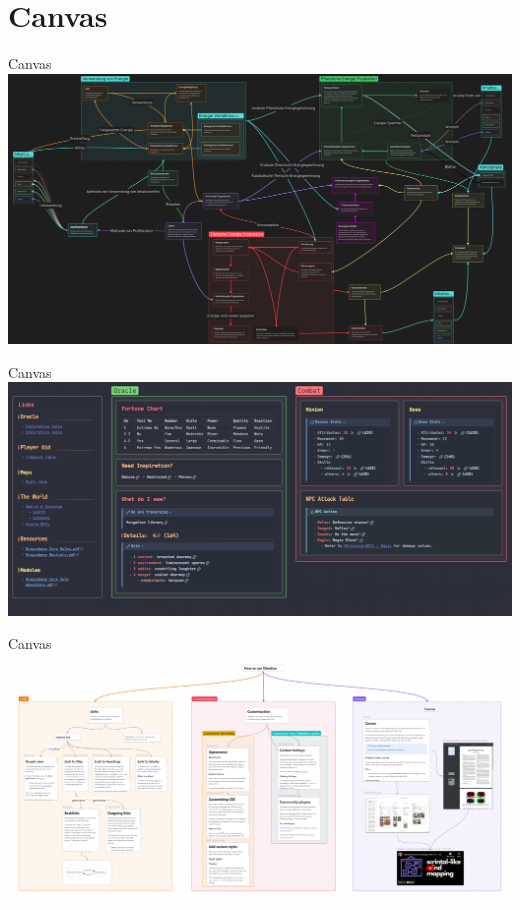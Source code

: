 \documentclass[10pt, xcolor=dvipsnames]{beamer}
\begin{document}
	\section{Canvas}
	\begin{frame}{Canvas}
		\centering
		\includegraphics[scale=.185]{../latex-image/canvas1}
	\end{frame}
	\begin{frame}{Canvas}
	\centering
	\includegraphics[scale=.3]{../latex-image/canvas2}
	\end{frame}
	\begin{frame}{Canvas}
	\centering
	\includegraphics[scale=.055]{../latex-image/canvas3}
	\end{frame}
	
\end{document}
